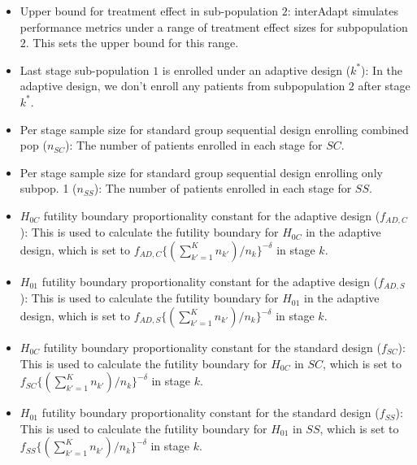 \documentclass{article}
\newcommand{\interAdapt}{\textsf{interAdapt }}
\begin{document}
\begin{itemize}
\item Upper bound for treatment effect in sub-population $2$: \interAdapt simulates performance metrics under a range of treatment effect sizes for subpopulation $2$. This sets the upper bound for this range.

\item Last stage sub-population $1$ is enrolled under an adaptive design ($k^*$): In the adaptive design, we don’t enroll any patients from subpopulation $2$ after stage $k^*$. %

\item Per stage sample size for standard group sequential design enrolling combined pop ($n_{SC}$): The number of patients enrolled in each stage for $SC$.

\item Per stage sample size for standard group sequential design enrolling only subpop. 1 ($n_{SS}$): The number of patients enrolled in each stage for $SS$.

\item $H_{0C}$ futility boundary proportionality constant for the adaptive design ($f_{AD,C}$): This is used to calculate the futility boundary for $H_{0C}$ in the adaptive design, which is set to $f_{AD,C}\{(\sum_{k'=1}^{K} n_{k'})/n_k\}^{-δ}$ in stage $k$.

\item $H_{01}$ futility boundary proportionality constant for the adaptive design ($f_{AD,S}$):  This is used to calculate the futility boundary for $H_{01}$ in the adaptive design, which is set to $f_{AD,S}\{(\sum_{k'=1}^{K} n_{k'})/n_k\}^{-δ}$ in stage $k$.

\item $H_{0C}$ futility boundary proportionality constant for the standard design ($f_{SC}$): This is used to calculate the futility boundary for $H_{0C}$ in $SC$, which is set to $f_{SC}\{(\sum_{k'=1}^{K} n_{k'})/n_k\}^{-δ}$ in stage $k$.

\item $H_{01}$ futility boundary proportionality constant for the standard design ($f_{SS}$):  This is used to calculate the futility boundary for $H_{01}$ in $SS$, which is set to $f_{SS}\{(\sum_{k'=1}^{K} n_{k'})/n_k\}^{-δ}$ in stage $k$.


\end{itemize}
\end{document}
